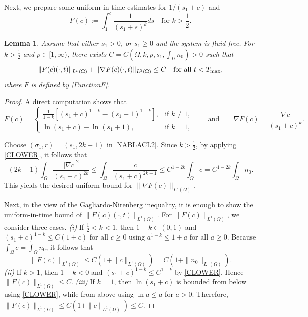 \documentclass{amsart}
\newtheorem{lemma}[defn]{Lemma}
\numberwithin{equation}{section}
\begin{document}
Next, we prepare some uniform-in-time estimates for $1/(s_{1}+c)$ and
\begin{equation}\label{FunctionF}
 F(c):=  \int_{1}^{c}\frac{1}{(s_{1}+s)^{k}}ds \quad  \mbox{for } k>\frac{1}{2}.
\end{equation}


\begin{lemma}
Assume that either $s_{1}>0$, or $s_{1}\ge0$ and the system is fluid-free.
For $k>\frac{1}{2}$ and $p\in[1,\infty)$, there exists $C=C(\Omega, k, p, s_1, \int_{\Omega} n_0)>0$ such that 
\begin{equation}\label{FLEM}
 \|F(c)(\cdot,t)\|_{L^{p}(\Omega)}+\|\nabla F(c)(\cdot,t)\|_{L^{2}(\Omega)} \le C\quad\mbox{for all }t<T_{\rm max},
\end{equation}
where $F$ is defined by \eqref{FunctionF}.
\end{lemma}
\begin{proof}
A direct computation shows that
\[
F(c)=
\begin{cases}
\frac{1}{1-k} \left[(s_1+c)^{1-k}-(s_1+1)^{1-k} \right], & \text{if } k\neq 1,\\[1mm]
\ln(s_1+c)-\ln(s_1+1), & \text{if } k=1,
\end{cases}
\qquad\text{and}\qquad
\nabla F(c)=\frac{\nabla c}{(s_1+c)^k}.
\]

Choose $(\sigma_1,r)=(s_1,2k-1)$ in \eqref{NABLACL2}. Since $k>\frac{1}{2}$, by applying \eqref{CLOWER}, it follows that  
\[
(2k-1)\int_\Omega \frac{|\nabla c|^2}{(s_1+c)^{2k}}
\le \int_\Omega \frac{c}{(s_1+c)^{2k-1}} \le C^{1-2k} \int_{\Omega} c = C^{1-2k} \int_{\Omega} n_0.
\]
This yields the desired uniform bound for $\|\nabla F(c)\|_{L^2(\Omega)}$.

Next, in the view of the Gagliardo-Nirenberg inequality, it is enough to show the uniform-in-time bound of $\| F(c)(\cdot,t)\|_{L^{1}(\Omega)}$.
For $\|F(c)\|_{L^1(\Omega)}$, we consider three cases. \emph{(i)} If $\frac{1}{2}<k<1$, then $1-k \in (0,1)$ and $(s_1 + c)^{1-k} \leq C(1+c)$ for all $c \geq 0$ using $a^{1-k} \le 1+a$ for all $a\ge 0$. Because $\int_{\Omega} c = \int_{\Omega} n_0$, it follows that
\[
\|F(c)\|_{L^1(\Omega)}\le C\left(1+\|c\|_{L^1(\Omega)}\right)
= C\left(1+\|n_0\|_{L^1(\Omega)}\right).
\]
\emph{(ii)} If $k>1$, then $1-k<0$ and $(s_1+c)^{1-k}\le C^{1-k}$ by \eqref{CLOWER}. Hence $\|F(c)\|_{L^1(\Omega)}\le C$.  
\emph{(iii)} If $k=1$, then $\ln (s_1 +c)$ is bounded from below using \eqref{CLOWER}, while from above using $\ln a \le a$ for $a>0$. Therefore, $\|F(c)\|_{L^1(\Omega)}\le C\left(1+\|c\|_{L^1(\Omega)}\right)\le C$.
\end{proof}
\end{document}
